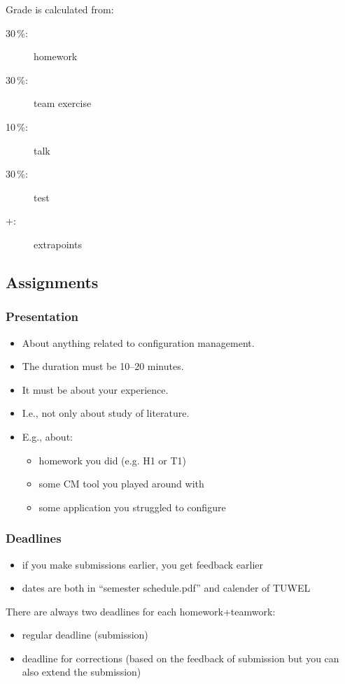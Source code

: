 \begin{frame}
	Grade is calculated from:
	\begin{description}
	\item[30\,\%:] homework
	\item[30\,\%:] team exercise
	\item[10\,\%:] talk
	\item[30\,\%:] test
	\item[+:] extrapoints
	\end{description}
\end{frame}

\subsection{Assignments}
\begin{frame}
	\frametitle{Presentation}
	\begin{itemize}
		\item About anything related to configuration management.
		\item The duration must be 10--20 minutes.
		\item It must be about your experience.
		\item I.e., not only about study of literature.
		\item E.g., about:
		\begin{itemize}
			\item homework you did (e.g. H1 or T1)
			\item some CM tool you played around with
			\item some application you struggled to configure
		\end{itemize}
	\end{itemize}
\end{frame}

\begin{frame}
	\frametitle{Deadlines}

	\begin{itemize}
	\item if you make submissions earlier, you get feedback earlier
	\item dates are both in ``semester schedule.pdf'' and calender of TUWEL
	\end{itemize}

	There are always two deadlines for each homework+teamwork:

	\begin{itemize}
	\item regular deadline (submission)
	\item deadline for corrections (based on the feedback of submission but you can also extend the submission)
	\end{itemize}
\end{frame}

